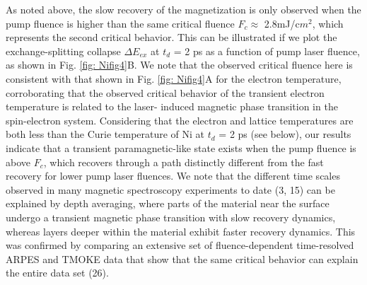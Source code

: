 As noted above, the slow recovery of the magnetization is only observed when the pump fluence is higher than the same critical fluence $F_{c} \approx$ 2.8mJ/c$m^2$, which represents the second critical behavior. This can be illustrated if we plot the exchange-splitting collapse $\Delta E_{ex}$ at $t_{d}$ = 2 ps as a function of pump laser fluence, as shown in Fig. \ref{fig: Nifig4}B. We note that the observed critical fluence here is consistent with that shown in Fig. \ref{fig: Nifig4}A for the electron temperature, corroborating that the observed critical behavior of the transient electron temperature is related to the laser- induced magnetic phase transition in the spin-electron system. Considering that the electron and lattice temperatures are both less than the Curie temperature of Ni at $t_{d}$ = 2 ps (see below), our results indicate that a transient paramagnetic-like state exists when the pump fluence is above $F_{c}$, which recovers through a path distinctly different from the fast recovery for lower pump laser fluences. We note that the different time scales observed in many magnetic spectroscopy experiments to date (3, 15) can be explained by depth averaging, where parts of the material near the surface undergo a transient magnetic phase transition with slow recovery dynamics, whereas layers deeper within the material exhibit faster recovery dynamics. This was confirmed by comparing an extensive set of fluence-dependent time-resolved ARPES and TMOKE data that show that the same critical behavior can explain the entire data set (26).

